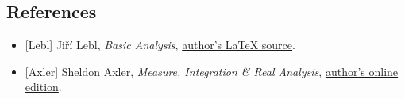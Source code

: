 \documentclass[
  11pt,
]{article}
\providecommand{\tightlist}{%
  \setlength{\itemsep}{0pt}\setlength{\parskip}{0pt}}
\begin{document}
\subsection{References}\label{references}

\begin{itemize}
\tightlist
\item
  {[}Lebl{]} Jiří Lebl, \emph{Basic Analysis},
  \href{https://github.com/jirilebl/ra/tree/e21ec524ca7d54f800c693b948020c188d21d01f}{author's
  LaTeX source}.
\item
  {[}Axler{]} Sheldon Axler, \emph{Measure, Integration \& Real
  Analysis}, \href{https://measure.axler.net/}{author's online edition}.
\end{itemize}
\end{document}
